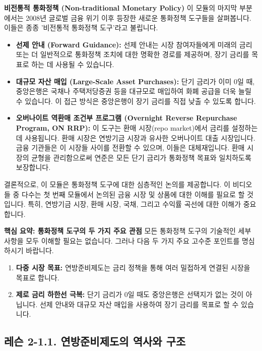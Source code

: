 \documentclass[11pt,a4paper]{book}
\theoremstyle{definition}
\begin{document}
\begin{conceptbox}
\textbf{비전통적 통화정책 (Non-traditional Monetary Policy)}
이 모듈의 마지막 부분에서는 2008년 글로벌 금융 위기 이후 등장한 새로운 통화정책 도구들을 살펴봅니다. 이들은 종종 '비전통적 통화정책 도구'라고 불립니다.
\begin{itemize}
    \item \textbf{선제 안내 (Forward Guidance):} 선제 안내는 시장 참여자들에게 미래의 금리 또는 더 일반적으로 통화정책 조치에 대한 명확한 경로를 제공하며, 장기 금리를 목표로 하는 데 사용될 수 있습니다.
    \item \textbf{대규모 자산 매입 (Large-Scale Asset Purchases):} 단기 금리가 이미 0일 때, 중앙은행은 국채나 주택저당증권 등을 대규모로 매입하여 화폐 공급을 더욱 늘릴 수 있습니다. 이 접근 방식은 중앙은행이 장기 금리를 직접 낮출 수 있도록 합니다.
    \item \textbf{오버나이트 역환매 조건부 프로그램 (Overnight Reverse Repurchase Program, ON RRP):} 이 도구는 환매 시장(repo market)에서 금리를 설정하는 데 사용됩니다. 환매 시장은 연방기금 시장과 유사한 오버나이트 대출 시장입니다. 금융 기관들은 이 시장들 사이를 전환할 수 있으며, 이들은 대체재입니다. 환매 시장의 균형을 관리함으로써 연준은 모든 단기 금리가 통화정책 목표와 일치하도록 보장합니다.
\end{itemize}
\end{conceptbox}

결론적으로, 이 모듈은 통화정책 도구에 대한 심층적인 논의를 제공합니다. 이 비디오들 중 다수는 첫 번째 모듈에서 논의된 금융 시장 및 상품에 대한 이해를 필요로 할 것입니다. 특히, 연방기금 시장, 환매 시장, 국채, 그리고 수익률 곡선에 대한 이해가 중요합니다.

\begin{summarybox}
\textbf{핵심 요약: 통화정책 도구의 두 가지 주요 관점}
모든 통화정책 도구의 기술적인 세부 사항을 모두 이해할 필요는 없습니다. 그러나 다음 두 가지 주요 고수준 포인트를 명심하시기 바랍니다.
\begin{enumerate}
    \item \textbf{다중 시장 목표:} 연방준비제도는 금리 정책을 통해 여러 밀접하게 연결된 시장을 목표로 합니다.
    \item \textbf{제로 금리 하한선 극복:} 단기 금리가 0일 때도 중앙은행은 선택지가 없는 것이 아닙니다. 선제 안내와 대규모 자산 매입을 사용하여 장기 금리를 목표로 할 수 있습니다.
\end{enumerate}
\end{summarybox}


\subsection{레슨 2-1.1. 연방준비제도의 역사와 구조}
\end{document}
